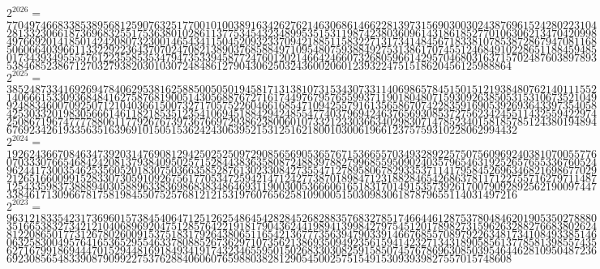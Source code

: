 \begin{enumerate}
 $2^{2026}=$
 \[77049746683385389568125907632517700101003891634262762146306861466228139731569030030243876961524280223104\]
 \[28133230661873696832551753638010286113775345432348995351531198742380360961431861852770106306213470420998\]
 \[49766920141850142420807323001465434115045209323370942188511583227131734148456718338107853872867947081168\]
 \[50606640396611332292236437070247082138903768588497109548075938849275313861707455124684910228651188459485\]
 \[01734393495555761223558535347947353394587724760120214664246607326805966142957046803163715702487603897893\]
 \[53846852386712703279382030103072484861279043062503243600206012393224751518620456125988864\]
$2^{2025}=$
 \[38524873341692694784062953816258850050501945817131381073153430733114069865784515015121938480762140111552\]
 \[14066615330936848416275876819005143056887672716174497679576559937119018048071593092638505315310673521049\]
 \[92488346007092507121040366150073271705752260466168547109425579161356586707422835916905392693643397354058\]
 \[42530332019830566614611821853512354106945188429424855477403796942463765693085372756234245511432559422974\]
 \[25086719674777788061177926767397367669729386238006010733212330366340298307147852340158185785124380194894\]
 \[676923426193356351639691015051536242430639521531251621800103006196612375759310228062994432\]
$2^{2024}=$
 \[19262436670846347392031476908129425025250972908565690536576715366557034932892257507560969240381070055776\]
 \[07033307665468424208137938409502571528443836358087248839788279968559509024035796546319252657655336760524\]
 \[96244173003546253560520183075036635852876130233084273554712789580678293353711417958452696346821698677029\]
 \[21265166009915283307305910926756177053472594214712427738701898471231882846542686378117122755716279711487\]
 \[12543359837388894030588963383698683834864693119003005366606165183170149153573926170079092892562190097447\]
 \[338461713096678175819845507525768121215319760765625810900051503098306187879655114031497216\]
$2^{2023}=$
 \[96312183354231736960157384540647125126254864542828452682883576832785174664461287537804846201905350278880\]
 \[35166538327342121040689692047512857642219181790436244198941399842797545120178982731596263288276683802624\]
 \[81220865017731267802600915375183179264380651165421367773563947903391466768557089792263481734108493385146\]
 \[06325830049576416536529554633780885267362971073562138693509492356159414232713431890585613778581398557435\]
 \[62716799186944470152944816918493419174323465595015026833030825915850745767869630850395464462810950487236\]
 \[69230856548339087909922753762884060607659880382812905450025751549153093939827557015748608\]


\end{enumerate}
